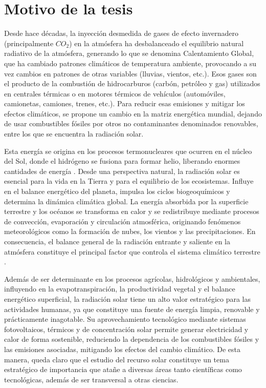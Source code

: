 \documentclass[letterpaper,12pt, twoside]{report}
\providecommand{\DIFdeltex}[1]{{\protect\color{red} \scriptsize #1}} %
\providecommand{\DIFdel}[1]{\texorpdfstring{\DIFdeltex{#1}}{}} %
\begin{document}
\section{\DIFdel{Motivo de la tesis}}
\addtocounter{section}{-1}%
\DIFdel{Desde hace décadas, la inyección desmedida de gases de efecto invernadero (principalmente $CO_2$) en la atmósfera ha desbalanceado el equilibrio natural radiativo de la atmósfera, generando lo que se denomina Calentamiento Global, que ha cambiado patrones climáticos de temperatura ambiente, provocando a su vez cambios en patrones de otras variables (lluvias, vientos, etc.). Esos gases son el producto de la combustión de hidrocarburos (carbón, petróleo y gas) utilizados en centrales térmicas o en motores térmicos de vehículos (automóviles, camionetas, camiones, trenes, etc.). Para reducir esas emisiones y mitigar los efectos climáticos, se propone un cambio en la matriz energética mundial, dejando de usar combustibles fósiles por otros no contaminantes denominados renovables, entre los que se encuentra la radiación solar.
}%

\DIFdel{Esta energía se origina en los procesos termonucleares que ocurren en el núcleo del Sol, donde el hidrógeno se fusiona para formar helio, liberando enormes cantidades de energía \citep{Wald2021}. Desde una perspectiva natural, la radiación solar es esencial para la vida en la Tierra y para el equilibrio de los ecosistemas. Influye en el balance energético del planeta, impulsa los ciclos biogeoquímicos y determina la dinámica climática global. La energía absorbida por la superficie terrestre y los océanos se transforma en calor y se redistribuye mediante procesos de convección, evaporación y circulación atmosférica, originando fenómenos meteorológicos como la formación de nubes, los vientos y las precipitaciones. En consecuencia, el balance general de la radiación entrante y saliente en la atmósfera constituye el principal factor que controla el sistema climático terrestre \citep{TrenberthStepaniak2004, Haigh2015, Gray2010}.
}%

\DIFdel{Además de ser determinante en los procesos agrícolas, hidrológicos y ambientales, influyendo en la evapotranspiración, la productividad vegetal y el balance energético superficial, la radiación solar tiene un alto valor estratégico para las actividades humanas, ya que constituye una fuente de energía limpia, renovable y prácticamente inagotable. Su aprovechamiento tecnológico mediante sistemas fotovoltaicos, térmicos y de concentración solar permite generar electricidad y calor de forma sostenible, reduciendo la dependencia de los combustibles fósiles y las emisiones asociadas, mitigando los efectos del cambio climático. De esta manera, queda claro que el estudio del recurso solar constituye un tema estratégico de importancia que atañe a diversas áreas tanto científicas como tecnológicas, además de ser transversal a otras ciencias.
}%
\end{document}
